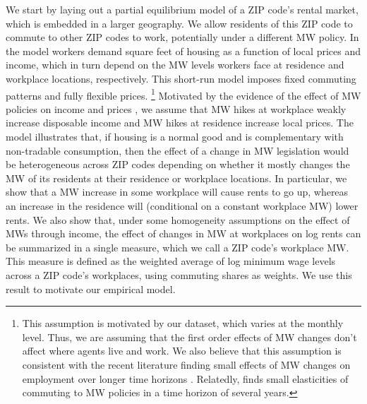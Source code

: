 We start by laying out a partial equilibrium model of a ZIP code's rental market,
which is embedded in a larger geography.
We allow residents of this ZIP code to commute to other ZIP codes to work, 
potentially under a different MW policy.
In the model workers demand square feet of housing as a function of local prices 
and income, which in turn depend on the MW levels workers face at residence and 
workplace locations, respectively.
This short-run model imposes fixed commuting patterns and fully flexible 
prices.%
\footnote{This assumption is motivated by our dataset, which varies at the 
monthly level. Thus, we are assuming that the first order effects of 
MW changes don't affect where agents live and work.
We also believe that this assumption is consistent with the recent literature
finding small effects of MW changes on employment over longer time horizons
\parencite[see][for a review]{Dube2019}.
Relatedly, \textcite{PerezPerez2021} finds small elasticities of commuting to MW 
policies in a time horizon of several years.}
Motivated by the evidence of the effect of MW policies on 
income \parencite{Dube2019Income, CegnizEtAl2019} and 
prices \parencite{AllegrettoReich2018, Leung2021},
we assume that MW hikes at workplace weakly increase disposable income and MW 
hikes at residence increase local prices.
The model illustrates that, if housing is a normal good and is complementary 
with non-tradable consumption, then the effect of a change in MW legislation 
would be heterogeneous across ZIP codes depending on whether it mostly changes 
the MW of its residents at their residence or workplace locations.
In particular, we show that a MW increase in some workplace will cause rents to 
go up, whereas an increase in the residence will (conditional on a constant 
workplace MW) lower rents.
We also show that, under some homogeneity assumptions on the effect of MWs 
through income, the effect of changes in MW at workplaces on log rents can be 
summarized in a single measure, which we call a ZIP code's workplace MW.
This measure is defined as the weighted average of log minimum wage levels 
across a ZIP code's workplaces, using commuting shares as weights.
We use this result to motivate our empirical model.


